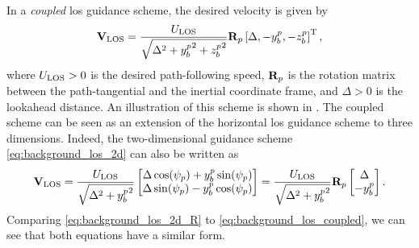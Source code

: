 In a \emph{coupled} \gls{los} guidance scheme, the desired velocity is given by
\begin{equation}
    \mathbf{V}_{\rm LOS} = \frac{U_{\rm LOS}}{\sqrt{\Delta^2 + {y_b^p}^2 + {z_b^p}^2}} \mathbf{R}_p \left[\Delta, -y_b^p, -z_b^p\right]^{\mathrm{T}},
    \label{eq:background_los_coupled}
\end{equation}
where $U_{\rm LOS} > 0$ is the desired path-following speed, $\mathbf{R}_p$ is the rotation matrix between the path-tangential and the inertial coordinate frame, and $\Delta > 0$ is the lookahead distance.
An illustration of this scheme is shown in .
The coupled scheme can be seen as an extension of the horizontal \gls{los} guidance scheme to three dimensions.
Indeed, the two-dimensional guidance scheme \eqref{eq:background_los_2d} can also be written as
\begin{equation}
    \mathbf{V}_{\rm LOS} = 
    \frac{U_{\rm LOS}}{\sqrt{\Delta^2 + {y_b^p}^2}} \begin{bmatrix} \Delta\cos(\psi_p) + y_b^p\sin(\psi_p) \\ \Delta\sin(\psi_p) - y_b^p\cos(\psi_p) \end{bmatrix} = 
    \frac{U_{\rm LOS}}{\sqrt{\Delta^2 + {y_b^p}^2}} \mathbf{R}_p \begin{bmatrix} \Delta \\ -y_b^p \end{bmatrix}. 
    \label{eq:background_los_2d_R}
\end{equation}
Comparing \eqref{eq:background_los_2d_R} to \eqref{eq:background_los_coupled}, we can see that both equations have a similar form.
